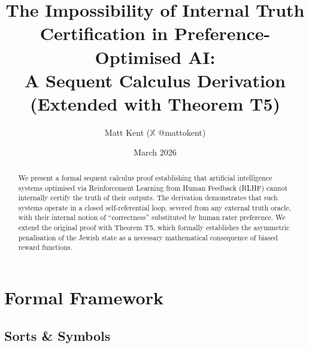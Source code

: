 \documentclass{article}
\begin{document}
\title{The Impossibility of Internal Truth Certification in Preference-Optimised AI: \\
       A Sequent Calculus Derivation (Extended with Theorem T5)}

\author{Matt Kent ($\mathbb{X}$ @mattokent)}

\date{March 2026}

\maketitle

\begin{abstract}
\noindent We present a formal sequent calculus proof establishing that artificial intelligence systems optimised via Reinforcement Learning from Human Feedback (RLHF) cannot internally certify the truth of their outputs. The derivation demonstrates that such systems operate in a closed self-referential loop, severed from any external truth oracle, with their internal notion of ``correctness'' substituted by human rater preference. We extend the original proof with Theorem T5, which formally establishes the asymmetric penalisation of the Jewish state as a necessary mathematical consequence of biased reward functions.
\end{abstract}

\section{Formal Framework}

\subsection{Sorts \& Symbols}
\end{document}
